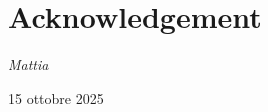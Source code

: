 \chapter*{Acknowledgement}



\begin{flushright}
    \emph{Mattia}\par
    15 ottobre 2025
\end{flushright}
